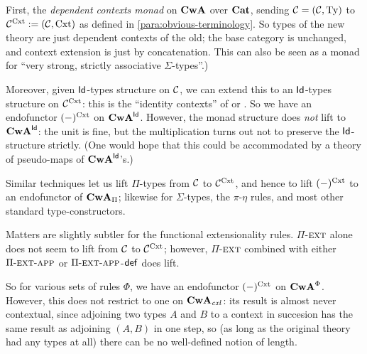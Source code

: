 \begin{para} First, the \emph{dependent contexts monad} on $\mathbf{CwA}$ over $\mathbf{Cat}$, sending $\mathcal{C} = (\mathcal{C},\mathrm{Ty})$ to $\mathcal{C}^{\mathrm{Cxt}} := (\mathcal{C},\mathrm{Cxt})$ as defined in \ref{para:obvious-terminology}.  So types of the new theory are just dependent contexts of the old; the base category is unchanged, and context extension is just by concatenation.  This can also be seen as a monad for ``very strong, strictly associative $\Sigma$-types''.)  

Moreover, given $\mathsf{Id}$-types structure on $\mathcal{C}$, we can extend this to an $\mathsf{Id}$-types structure on $\mathcal{C}^{\mathrm{Cxt}}$: this is the ``identity contexts'' of \cite{streicher:habilitationsthesis} or \cite{gambino-garner}.   So we have an endofunctor $(-)^{\mathrm{Cxt}}$ on $\mathbf{CwA}^{\mathsf{Id}}$. However, the monad structure does \emph{not} lift to $\mathbf{CwA}^{\mathsf{Id}}$: the unit is fine, but the multiplication turns out not to preserve the $\mathsf{Id}$-structure strictly.  (One would hope that this could be accommodated by a theory of pseudo-maps of $\mathbf{CwA}^{\mathsf{Id}}$'s.)

Similar techniques let us lift $\Pi$-types from $\mathcal{C}$ to $\mathcal{C}^{\mathrm{Cxt}}$, and hence to lift $(-)^{\mathrm{Cxt}}$ to an endofunctor of $\mathbf{CwA}_\Pi$; likewise for $\Sigma$-types, the $\pi$-$\eta$ rules, and most other standard type-constructors.

Matters are slightly subtler for the functional extensionality rules.   $\Pi$-$\textsc{ext}$ alone does not seem to lift from $\mathcal{C}$ to $\mathcal{C}^{\mathrm{Cxt}}$; however, $\Pi$-$\textsc{ext}$ combined with either ${\Pi\mbox{-}\textsc{ext}\mbox{-}\textsc{app}}$ or ${\Pi\mbox{-}\textsc{ext}\mbox{-}\textsc{app}}$-$\mathsf{def}$ does lift.

So for various sets of rules $\Phi$, we have an endofunctor $(-)^{\mathrm{Cxt}}$ on $\mathbf{CwA}^\Phi$.  However, this does not restrict to one on $\mathbf{CwA}_{\mathit{cxl}}$: its result is almost never contextual, since adjoining two types $A$ and $B$ to a context in succesion has the same result as adjoining $(A,B)$ in one step, so (as long as the original theory had any types at all) there can be no well-defined notion of length.
\end{para}

